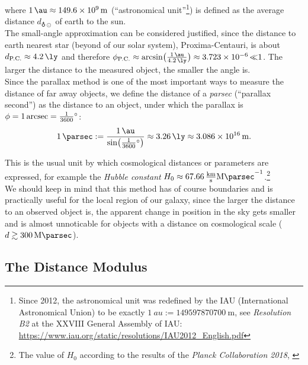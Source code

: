 where $\SI{1}{\au} \approx \SI{149.6e+9}{\meter}$ (``astronomical unit''\footnote{Since 2012, the astronomical unit was redefined by the IAU (International Astronomical Union) to be exactly $\SI{1}{au} := \SI{149597870700}{\meter}$, see \textit{Resolution B2} at the XXVIII General Assembly of IAU: \href{https://www.iau.org/static/resolutions/IAU2012\_English.pdf}{https://www.iau.org/static/resolutions/IAU2012\_English.pdf}}) is defined as the average distance $d_{\earth \odot}$ of earth to the sun. \\ 
The small-angle approximation can be considered justified, since the distance to earth nearest star (beyond of our solar system), Proxima-Centauri, is about $d_{\text{P.C.}} \approx \SI{4.2}{\ly}$ and therefore $\phi_{\text{P.C.}} \approx \arcsin \bigl( \frac{\SI{1}{\au}}{\SI{4.2}{\ly}} \bigr) \approx \SI{3.723e-6} \ll 1$.
The larger the distance to the measured object, the smaller the angle is. \\
\noindent Since the parallax method is one of the most important ways to measure the distance of far away objects, we define the distance of a \textit{parsec} (``parallax second'') as the distance to an object, under which the parallax is $\phi = \SI{1}{\arcsec} = \frac{1}{3600} \SI{}{\degree}$:
\begin{align}
    \SI{1}{\parsec} := \frac{\SI{1}{\au}}{\sin \bigl( \frac{1}{3600} \SI{}{\degree} \bigr)} \approx \SI{3.26}{\ly} \approx \SI{3.086e16}{\meter}.
\end{align}

\noindent This is the usual unit by which cosmological distances or parameters are expressed, for example the \textit{Hubble constant} $H_{0} \approx \SI{67.66}{\frac{\kilo \meter}{\second} \mega \parsec^{-1}}$.\footnote{The value of $H_{0}$ according to the results of the \textit{Planck Collaboration 2018}, \cite[Table 7]{Planck2020} } \\ 

\noindent We should keep in mind that this method has of course boundaries and is practically useful for the local region of our galaxy, since the larger the distance to an observed object is, the apparent change in position in the sky gets smaller and is almost unnoticable for objects with a distance on cosmological scale ($d \gtrsim \SI{300}{\mega \parsec}$). 

\subsection{The Distance Modulus}

